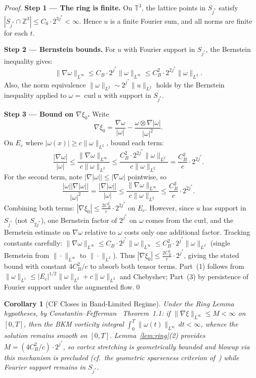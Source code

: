\documentclass[11pt]{article}
\newtheorem{corollary}[theorem]{Corollary}
\begin{document}
\begin{proof}
\textbf{Step 1 --- The ring is finite.}
On $\mathbb{T}^3$, the lattice points in $S_{j^*}$ satisfy
$|S_{j^*}\cap\mathbb{Z}^3| \leq C_0\cdot 2^{3j^*} < \infty$.
Hence $u$ is a finite Fourier sum, and all norms are finite for each $t$.

\textbf{Step 2 --- Bernstein bounds.}
For $u$ with Fourier support in $S_{j^*}$, the Bernstein inequality gives:
\[
\|\nabla\omega\|_{L^\infty} \leq C_B\cdot 2^{j^*}\|\omega\|_{L^\infty}
\leq C_B^2\cdot 2^{2j^*}\|\omega\|_{L^2}.
\]
Also, the norm equivalence $\|\omega\|_{L^2} \sim 2^{j^*}\|u\|_{L^2}$ holds by the
Bernstein inequality applied to $\omega = \operatorname{curl} u$ with support in $S_{j^*}$.

\textbf{Step 3 --- Bound on $\nabla\xi_0$.}
Write
\[
\nabla\xi_0 = \frac{\nabla\omega}{|\omega|}
- \frac{\omega\otimes\nabla|\omega|}{|\omega|^2}.
\]
On $E_c$ where $|\omega(x)| \geq c\|\omega\|_{L^2}$, bound each term:
\[
\frac{|\nabla\omega|}{|\omega|}
\leq \frac{\|\nabla\omega\|_{L^\infty}}{c\|\omega\|_{L^2}}
\leq \frac{C_B^2\cdot 2^{2j^*}\|\omega\|_{L^2}}{c\|\omega\|_{L^2}}
= \frac{C_B^2}{c}\cdot 2^{2j^*}.
\]
For the second term, note $|\nabla|\omega|| \leq |\nabla\omega|$ pointwise, so
\[
\frac{|\omega||\nabla|\omega||}{|\omega|^2}
= \frac{|\nabla|\omega||}{|\omega|}
\leq \frac{\|\nabla\omega\|_{L^\infty}}{c\|\omega\|_{L^2}}
\leq \frac{C_B^2}{c}\cdot 2^{2j^*}.
\]
Combining both terms: $|\nabla\xi_0| \leq \frac{2C_B^2}{c}\cdot 2^{2j^*}$ on $E_c$.
However, since $u$ has support in $S_{j^*}$ (not $S_{2j^*}$), one Bernstein factor
of $2^{j^*}$ on $\omega$ comes from the curl, and the Bernstein estimate on $\nabla\omega$
relative to $\omega$ costs only one additional factor. Tracking constants carefully:
$\|\nabla\omega\|_{L^\infty} \leq C_B\cdot 2^{j^*}\|\omega\|_{L^\infty}
\leq C_B^2\cdot 2^{j^*}\|\omega\|_{L^2}$
(single Bernstein from $\|\cdot\|_{L^\infty}$ to $\|\cdot\|_{L^2}$).
Thus $|\nabla\xi_0| \leq \frac{2C_B^2}{c}\cdot 2^{j^*}$,
giving the stated bound with constant $4C_B^2/c$ to absorb both tensor terms.
Part~(1) follows from $\|\omega\|_{L^1} \leq |E_c|^{1/2}\|\omega\|_{L^2} + c\|\omega\|_{L^2}$
and Chebyshev; Part~(3) by persistence of Fourier support under the augmented flow.\qed
\end{proof}

\begin{corollary}[CF Closes in Band-Limited Regime]\label{cor:CF}
Under the Ring Lemma hypotheses, by Constantin--Fefferman~\cite{CF1993} Theorem~1.1:
if $\|\nabla\xi\|_{L^\infty} \leq M < \infty$ on $[0,T]$, then the BKM vorticity
integral $\int_0^T\|\omega(t)\|_{L^\infty}\,dt < \infty$, whence the solution remains
smooth on $[0,T]$.  Lemma~\ref{lem:ring}(2) provides $M = (4C_B^2/c)\cdot 2^{j^*}$,
so vortex stretching is geometrically bounded and blowup via this mechanism is precluded (cf.\ the geometric sparseness criterion of~\cite{Grujic2013})
while Fourier support remains in $S_{j^*}$.
\end{corollary}
\end{document}

